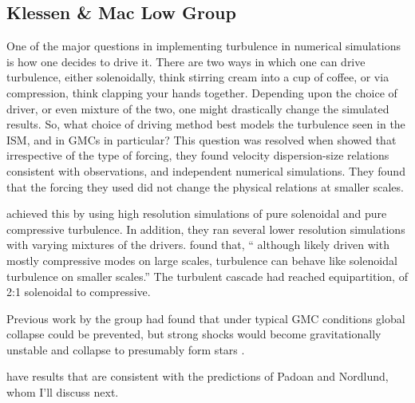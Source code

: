 \documentclass[../dissertation.tex]{subfiles}
\begin{document}
\subsection{Klessen \& Mac Low Group} 
One of the major questions in implementing turbulence in numerical simulations is how one decides to drive it. 
There are two ways in which one can drive turbulence, either solenoidally, think stirring cream into a cup of coffee, 
or via compression, think clapping your hands together. 
Depending upon the choice of driver, or even mixture of the two, one might drastically change the simulated results. 
So, what choice of driving method best models the turbulence seen in the ISM, and in GMCs in particular?
This question was resolved when \citet{2010A&A...512A..81F} showed that irrespective of the type of forcing, 
they found velocity dispersion-size relations consistent with observations, and independent numerical simulations. 
They found that the forcing they used did not change the physical relations at smaller scales. 

\citet{2010A&A...512A..81F} achieved this by using high resolution simulations of pure solenoidal and pure compressive turbulence. 
In addition, they ran several lower resolution simulations with varying mixtures of the drivers.
\citet{2010A&A...512A..81F} found that, `` although likely driven with mostly compressive modes on large scales, turbulence can behave like solenoidal turbulence on smaller scales.''
The turbulent cascade had reached equipartition, of 2:1 solenoidal to compressive. 

Previous work by the group had found that under typical GMC conditions global collapse could be prevented, 
but strong shocks would become gravitationally unstable and collapse to presumably form stars \citep{2000ApJ...535..887K}.

\citet{2004ApJ...605..800L} have results that are consistent with the predictions of Padoan and Nordlund, whom I'll discuss next.

%
%
\end{document}
